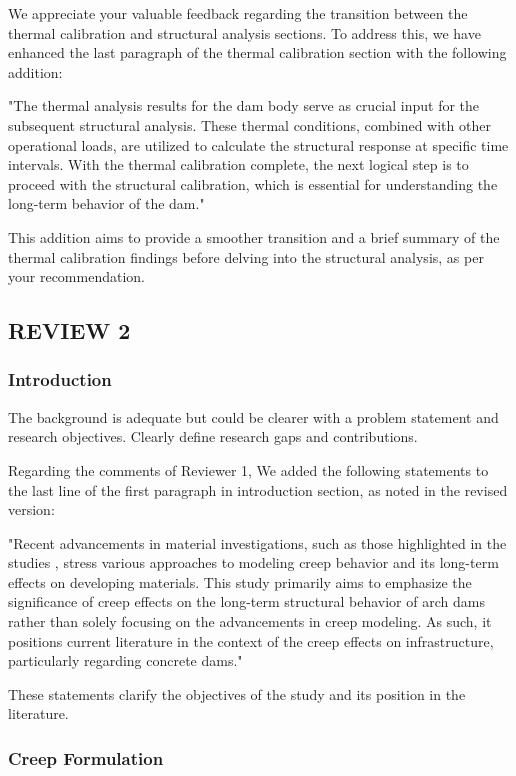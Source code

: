 \documentclass{ar2rc}
\begin{document}
	\AR We appreciate your valuable feedback regarding the transition between the thermal calibration and structural analysis sections. To address this, we have enhanced the last paragraph of the thermal calibration section with the following addition:
	
	"The thermal analysis results for the dam body serve as crucial input for the subsequent structural analysis. These thermal conditions, combined with other operational loads, are utilized to calculate the structural response at specific time intervals. With the thermal calibration complete, the next logical step is to proceed with the structural calibration, which is essential for understanding the long-term behavior of the dam."
	
	This addition aims to provide a smoother transition and a brief summary of the thermal calibration findings before delving into the structural analysis, as per your recommendation.


	\subsection{REVIEW 2}
	\subsubsection{Introduction}
	\RC The background is adequate but could be clearer with a problem statement and research objectives. Clearly define research gaps and contributions.
	
	\AR Regarding the comments of Reviewer 1, We added the following statements to the last line of the first paragraph in introduction section, as noted in the revised version:
	
	"Recent advancements in material investigations, such as those highlighted in the studies \cite{ma15207098,KAKASORISMAELJAF2023132604,EMAD20221243,su15043085}, stress various approaches to modeling creep behavior and its long-term effects on developing materials. This study primarily aims to emphasize the significance of creep effects on the long-term structural behavior of arch dams rather than solely focusing on the advancements in creep modeling. As such, it positions current literature in the context of the creep effects on infrastructure, particularly regarding concrete dams."
	
	These statements clarify the objectives of the study and its position in the literature.
	
	\subsubsection{Creep Formulation}
	
\end{document}
